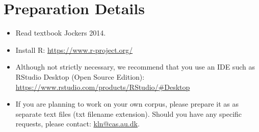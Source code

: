 \documentclass[12pt,a4paper]{article}
\begin{document}
\section*{\hypertarget{prep_det}{Preparation Details}}
\begin{itemize}
\item Read textbook Jockers 2014.
\item Install R: \url{https://www.r-project.org/}
\item Although not strictly necessary, we recommend that you use an IDE such as RStudio Desktop (Open Source Edition): \url{https://www.rstudio.com/products/RStudio/#Desktop}
\item If you are planning to work on your own corpus, please prepare it as as separate text files (txt filename extension). Should you have any specific requests, please contact: \href{mailto:kln@cas.au.dk}{kln@cas.au.dk}. 
\end{itemize}
\end{document}
